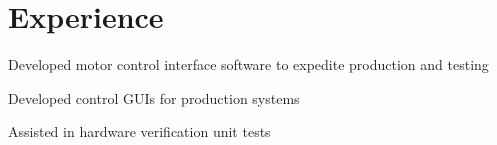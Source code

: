 \documentclass[]{deedy-resume-openfont}
\begin{document}
\begin{minipage}[t]{0.66\textwidth} 


\section{Experience}

\vspace{\topsep} %
\begin{tightemize}
	\item Developed motor control interface software to expedite production and testing
	\item Developed control GUIs for production systems
	\item Assisted in hardware verification unit tests
	
\end{tightemize}
\sectionsep


\end{minipage}
\end{document}
